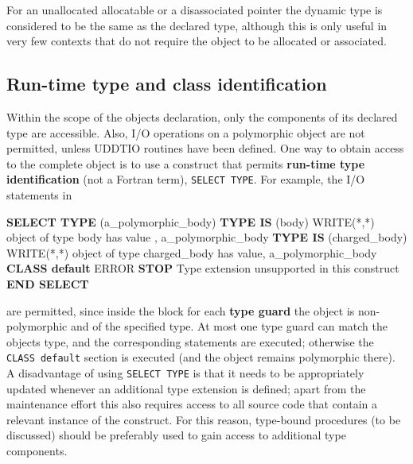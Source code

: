 \documentclass[]{scrartcl}
\newenvironment{Shaded}{}{}
\newcommand{\FunctionTok}[1]{\textcolor[rgb]{0.02,0.16,0.49}{#1}}
\newcommand{\KeywordTok}[1]{\textcolor[rgb]{0.00,0.44,0.13}{\textbf{#1}}}
\newcommand{\NormalTok}[1]{#1}
\newcommand{\StringTok}[1]{\textcolor[rgb]{0.25,0.44,0.63}{#1}}
\begin{document}
For an unallocated allocatable or a disassociated pointer the dynamic
type is considered to be the same as the declared type, although this is
only useful in very few contexts that do not require the object to be
allocated or associated.

\subsection{Run-time type and class
identification}\label{run-time-type-and-class-identification}

Within the scope of the object\textquotesingle s declaration, only the
components of its declared type are accessible. Also, I/O operations on
a polymorphic object are not permitted, unless UDDTIO routines have been
defined. One way to obtain access to the complete object is to use a
construct that permits \textbf{run-time type identification} (not a
Fortran term), \texttt{SELECT\ TYPE}. For example, the I/O statements in

\begin{Shaded}
\begin{Highlighting}[]
\KeywordTok{SELECT TYPE}\NormalTok{ (a\_polymorphic\_body)}
\KeywordTok{TYPE IS}\NormalTok{ (body)}
   \FunctionTok{WRITE(*}\NormalTok{,}\FunctionTok{*)} \StringTok{\textquotesingle{}object of type body has value        \textquotesingle{}}\NormalTok{, a\_polymorphic\_body}
\KeywordTok{TYPE IS}\NormalTok{ (charged\_body)}
   \FunctionTok{WRITE(*}\NormalTok{,}\FunctionTok{*)} \StringTok{\textquotesingle{}object of type charged\_body has value\textquotesingle{}}\NormalTok{, a\_polymorphic\_body}
\KeywordTok{CLASS default}
\NormalTok{   ERROR }\KeywordTok{STOP} \StringTok{\textquotesingle{}Type extension unsupported in this construct\textquotesingle{}}
\KeywordTok{END SELECT}
\end{Highlighting}
\end{Shaded}

are permitted, since inside the block for each \textbf{type guard} the
object is non-polymorphic and of the specified type. At most one type
guard can match the object\textquotesingle s type, and the corresponding
statements are executed; otherwise the \texttt{CLASS\ default} section
is executed (and the object remains polymorphic there). A disadvantage
of using \texttt{SELECT\ TYPE} is that it needs to be appropriately
updated whenever an additional type extension is defined; apart from the
maintenance effort this also requires access to all source code that
contain a relevant instance of the construct. For this reason,
type-bound procedures (to be discussed) should be preferably used to
gain access to additional type components.
\end{document}
